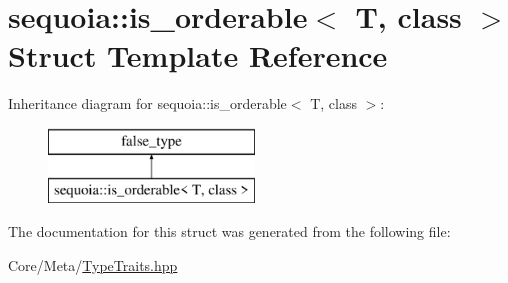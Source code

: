 \hypertarget{structsequoia_1_1is__orderable}{}\section{sequoia\+::is\+\_\+orderable$<$ T, class $>$ Struct Template Reference}
\label{structsequoia_1_1is__orderable}
Inheritance diagram for sequoia\+::is\+\_\+orderable$<$ T, class $>$\+:\begin{figure}[H]
\begin{center}
\leavevmode
\includegraphics[height=2.000000cm]{structsequoia_1_1is__orderable}
\end{center}
\end{figure}


The documentation for this struct was generated from the following file\+:\begin{DoxyCompactItemize}
\item 
Core/\+Meta/\mbox{\hyperlink{_type_traits_8hpp}{Type\+Traits.\+hpp}}\end{DoxyCompactItemize}
